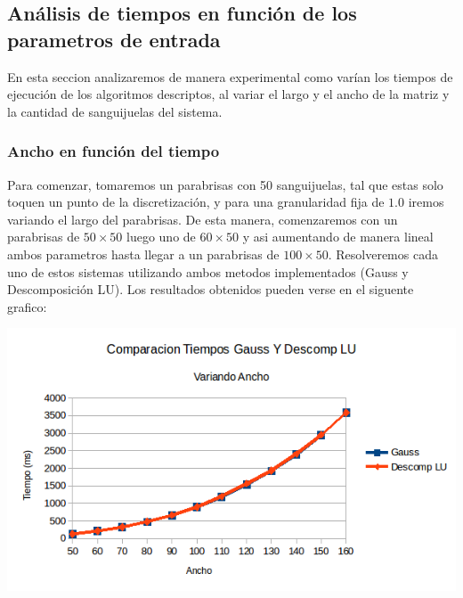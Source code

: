 \subsection{An\'alisis de tiempos en funci\'on de los parametros de entrada}
En esta seccion analizaremos de manera experimental como varían los tiempos de ejecución de los algoritmos descriptos, al variar el largo y el ancho de la matriz y la cantidad de sanguijuelas del sistema.
\subsubsection{Ancho en función del tiempo}
Para comenzar, tomaremos un parabrisas con 50 sanguijuelas, tal que estas solo toquen un punto de la discretización, y para una granularidad fija de $1.0$ iremos variando el largo del parabrisas. De esta manera, comenzaremos con un parabrisas de $50 \times 50$ luego uno de $60 \times 50$ y asi aumentando de manera lineal ambos parametros hasta llegar a un parabrisas de $100 \times 50$. Resolveremos cada uno de estos sistemas utilizando ambos metodos implementados (Gauss y Descomposición LU). Los resultados obtenidos pueden verse en el siguente grafico:

\begin{center}
 \includegraphics[width=400pt]{imagenes/testeo/anchoGauss.png}
\end{center}


